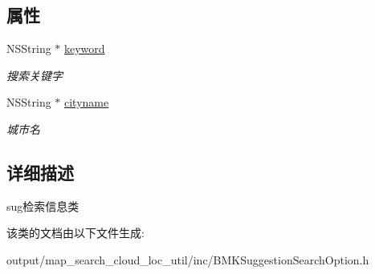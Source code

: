 \subsection*{属性}
\begin{DoxyCompactItemize}
\item 
\hypertarget{interface_b_m_k_suggestion_search_option_a2b769ad03eb52e46d9e14e8c096b6b43}{N\+S\+String $\ast$ \hyperlink{interface_b_m_k_suggestion_search_option_a2b769ad03eb52e46d9e14e8c096b6b43}{keyword}}\label{interface_b_m_k_suggestion_search_option_a2b769ad03eb52e46d9e14e8c096b6b43}

\begin{DoxyCompactList}\small\item\em 搜索关键字 \end{DoxyCompactList}\item 
\hypertarget{interface_b_m_k_suggestion_search_option_a938c2265022ca94d18c636388fc75e68}{N\+S\+String $\ast$ \hyperlink{interface_b_m_k_suggestion_search_option_a938c2265022ca94d18c636388fc75e68}{cityname}}\label{interface_b_m_k_suggestion_search_option_a938c2265022ca94d18c636388fc75e68}

\begin{DoxyCompactList}\small\item\em 城市名 \end{DoxyCompactList}\end{DoxyCompactItemize}


\subsection{详细描述}
sug检索信息类 

该类的文档由以下文件生成\+:\begin{DoxyCompactItemize}
\item 
output/map\+\_\+search\+\_\+cloud\+\_\+loc\+\_\+util/inc/B\+M\+K\+Suggestion\+Search\+Option.\+h\end{DoxyCompactItemize}

